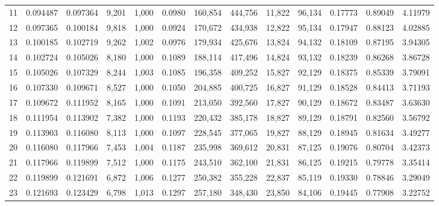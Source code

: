 \begin{tabular}{rrrrrrrrrrrrr}
11  &  0.094487 &  0.097364 &   9,201 &  1,000 &                                     0.0980 &  160,854 &  444,756 &   11,822 &   96,134 &  0.17773 &  0.89049 &  4.11979 \\
12  &  0.097365 &  0.100184 &   9,818 &  1,000 &                                     0.0924 &  170,672 &  434,938 &   12,822 &   95,134 &  0.17947 &  0.88123 &  4.02885 \\
13  &  0.100185 &  0.102719 &   9,262 &  1,002 &                                     0.0976 &  179,934 &  425,676 &   13,824 &   94,132 &  0.18109 &  0.87195 &  3.94305 \\
14  &  0.102724 &  0.105026 &   8,180 &  1,000 &                                     0.1089 &  188,114 &  417,496 &   14,824 &   93,132 &  0.18239 &  0.86268 &  3.86728 \\
15  &  0.105026 &  0.107329 &   8,244 &  1,003 &                                     0.1085 &  196,358 &  409,252 &   15,827 &   92,129 &  0.18375 &  0.85339 &  3.79091 \\
16  &  0.107330 &  0.109671 &   8,527 &  1,000 &                                     0.1050 &  204,885 &  400,725 &   16,827 &   91,129 &  0.18528 &  0.84413 &  3.71193 \\
17  &  0.109672 &  0.111952 &   8,165 &  1,000 &                                     0.1091 &  213,050 &  392,560 &   17,827 &   90,129 &  0.18672 &  0.83487 &  3.63630 \\
18  &  0.111954 &  0.113902 &   7,382 &  1,000 &                                     0.1193 &  220,432 &  385,178 &   18,827 &   89,129 &  0.18791 &  0.82560 &  3.56792 \\
19  &  0.113903 &  0.116080 &   8,113 &  1,000 &                                     0.1097 &  228,545 &  377,065 &   19,827 &   88,129 &  0.18945 &  0.81634 &  3.49277 \\
20  &  0.116080 &  0.117966 &   7,453 &  1,004 &                                     0.1187 &  235,998 &  369,612 &   20,831 &   87,125 &  0.19076 &  0.80704 &  3.42373 \\
21  &  0.117966 &  0.119899 &   7,512 &  1,000 &                                     0.1175 &  243,510 &  362,100 &   21,831 &   86,125 &  0.19215 &  0.79778 &  3.35414 \\
22  &  0.119899 &  0.121691 &   6,872 &  1,006 &                                     0.1277 &  250,382 &  355,228 &   22,837 &   85,119 &  0.19330 &  0.78846 &  3.29049 \\
23  &  0.121693 &  0.123429 &   6,798 &  1,013 &                                     0.1297 &  257,180 &  348,430 &   23,850 &   84,106 &  0.19445 &  0.77908 &  3.22752 \\

\end{tabular}
